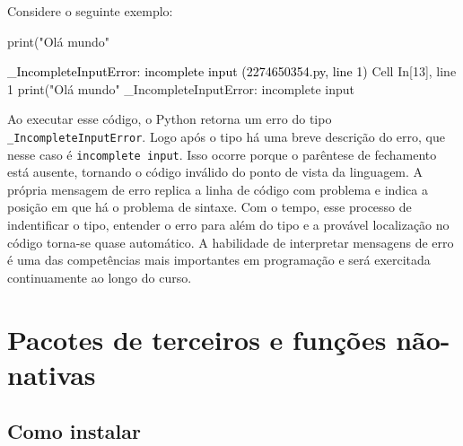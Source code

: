 \documentclass[
  brazilian,
  letterpaper,
  DIV=11,
  numbers=noendperiod]{scrreprt}
\newenvironment{Shaded}{\begin{snugshade}}{\end{snugshade}}
\newcommand{\BuiltInTok}[1]{\textcolor[rgb]{0.00,0.23,0.31}{#1}}
\newcommand{\NormalTok}[1]{\textcolor[rgb]{0.00,0.23,0.31}{#1}}
\newcommand{\StringTok}[1]{\textcolor[rgb]{0.13,0.47,0.30}{#1}}
\begin{document}
Considere o seguinte exemplo:

\begin{Shaded}
\begin{Highlighting}[]
\BuiltInTok{print}\NormalTok{(}\StringTok{"Olá mundo"}
\end{Highlighting}
\end{Shaded}

\begin{Highlighting}
\textcolor{black}{\_IncompleteInputError: incomplete input (2274650354.py, line 1)}
\textcolor{black}{  }\textcolor{QuartoInternalColor1}{Cell}\textcolor{QuartoInternalColor2}{}\textcolor{QuartoInternalColor1}{ }\textcolor{QuartoInternalColor2}{}\textcolor{QuartoInternalColor3}{In[13]}\textcolor{QuartoInternalColor2}{}\textcolor{QuartoInternalColor3}{, line 1}\textcolor{QuartoInternalColor2}{}
\textcolor{QuartoInternalColor2}{}\textcolor{QuartoInternalColor4}{    }\textcolor{QuartoInternalColor2}{}\textcolor{QuartoInternalColor4}{print("Olá mundo"}\textcolor{QuartoInternalColor2}{}
\textcolor{QuartoInternalColor2}{                     \textasciicaret{}}
\textcolor{QuartoInternalColor2}{}\textcolor{QuartoInternalColor4}{\_IncompleteInputError}\textcolor{QuartoInternalColor2}{}\textcolor{QuartoInternalColor4}{:}\textcolor{QuartoInternalColor2}{ incomplete input}
\end{Highlighting}

Ao executar esse código, o Python retorna um erro do tipo
\texttt{\_IncompleteInputError}. Logo após o tipo há uma breve descrição
do erro, que nesse caso é \texttt{incomplete\ input}. Isso ocorre porque
o parêntese de fechamento está ausente, tornando o código inválido do
ponto de vista da linguagem. A própria mensagem de erro replica a linha
de código com problema e indica a posição em que há o problema de
sintaxe. Com o tempo, esse processo de indentificar o tipo, entender o
erro para além do tipo e a provável localização no código torna-se quase
automático. A habilidade de interpretar mensagens de erro é uma das
competências mais importantes em programação e será exercitada
continuamente ao longo do curso.

\section{Pacotes de terceiros e funções
não-nativas}\label{pacotes-de-terceiros-e-funuxe7uxf5es-nuxe3o-nativas}

\subsection{Como instalar}\label{como-instalar-1}
\end{document}
